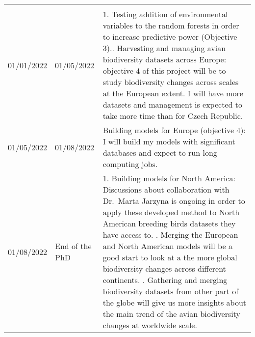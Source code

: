 \documentclass[
  12pt,
  oneside]{report}
\begin{document}
\begin{longtable}[]{@{}lll@{}}
\begin{minipage}[t]{0.49\columnwidth}
\end{minipage}\tabularnewline
\begin{minipage}[t]{0.21\columnwidth}\raggedright
01/01/2022\strut
\end{minipage} & \begin{minipage}[t]{0.21\columnwidth}\raggedright
01/05/2022\strut
\end{minipage} & \begin{minipage}[t]{0.49\columnwidth}\raggedright
1. Testing addition of environmental variables to the random forests in order to increase predictive power (Objective 3).\newline 2. Harvesting and managing avian biodiversity datasets across Europe: objective 4 of this project will be to study biodiversity changes across scales at the European extent. I will have more datasets and management is expected to take more time than for Czech Republic.\strut
\end{minipage}\tabularnewline
\begin{minipage}[t]{0.21\columnwidth}\raggedright
01/05/2022\strut
\end{minipage} & \begin{minipage}[t]{0.21\columnwidth}\raggedright
01/08/2022\strut
\end{minipage} & \begin{minipage}[t]{0.49\columnwidth}\raggedright
Building models for Europe (objective 4): I will build my models with significant databases and expect to run long computing jobs.\strut
\end{minipage}\tabularnewline
\begin{minipage}[t]{0.21\columnwidth}\raggedright
01/08/2022\strut
\end{minipage} & \begin{minipage}[t]{0.21\columnwidth}\raggedright
End of the PhD\strut
\end{minipage} & \begin{minipage}[t]{0.49\columnwidth}\raggedright
1. Building models for North America: Discussions about collaboration with Dr.~Marta Jarzyna is ongoing in order to apply these developed method to North American breeding birds datasets they have access to. \newline 2. Merging the European and North American models will be a good start to look at a the more global biodiversity changes across different continents. \newline 3. Gathering and merging biodiversity datasets from other part of the globe will give us more insights about the main trend of the avian biodiversity changes at worldwide scale.\strut
\end{minipage}\tabularnewline
\bottomrule
\end{longtable}
\end{document}
